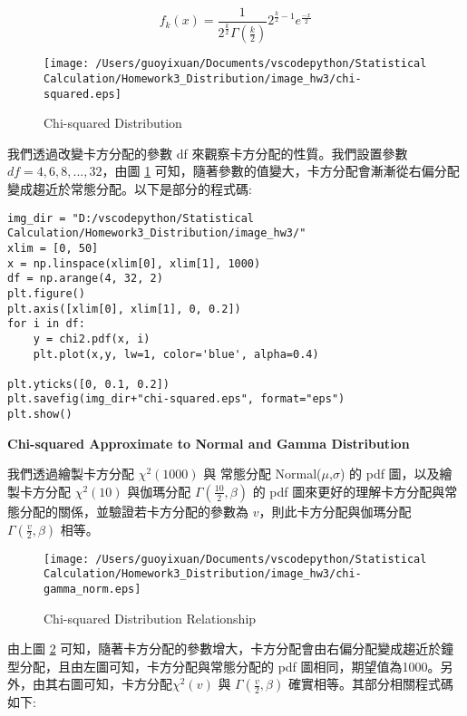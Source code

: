 \begin{equation}
f_k(x)=\frac{1}{2^{\frac{k}{2}}\Gamma{(\frac{k}{2})}}2^{\frac{k}{2}-1}e^{\frac{-x}{2}}
\end{equation}

\begin{figure}[H]
    \centering
        \texttt{[image: /Users/guoyixuan/Documents/vscodepython/Statistical Calculation/Homework3\_Distribution/image\_hw3/chi-squared.eps]}
    \caption{Chi-squared Distribution}
    \label{fig:Chi-squared Distribution}
\end{figure}

我們透過改變卡方分配的參數 df 來觀察卡方分配的性質。我們設置參數 $df=4, 6, 8,...,32$，由圖 \ref{fig:Chi-squared Distribution} 可知，隨著參數的值變大，卡方分配會漸漸從右偏分配變成趨近於常態分配。以下是部分的程式碼:

\bigskip
\begin{lstlisting}
img_dir = "D:/vscodepython/Statistical Calculation/Homework3_Distribution/image_hw3/"
xlim = [0, 50]
x = np.linspace(xlim[0], xlim[1], 1000) 
df = np.arange(4, 32, 2)
plt.figure()
plt.axis([xlim[0], xlim[1], 0, 0.2])
for i in df:
    y = chi2.pdf(x, i)
    plt.plot(x,y, lw=1, color='blue', alpha=0.4)
    
plt.yticks([0, 0.1, 0.2])
plt.savefig(img_dir+"chi-squared.eps", format="eps")
plt.show()
\end{lstlisting}


\textbf{Chi-squared Approximate to Normal and Gamma Distribution}

我們透過繪製卡方分配 $\chi^2(1000)$ 與 常態分配 Normal($\mu$,$\sigma$) 的 pdf 圖，以及繪製卡方分配 $\chi^2(10)$ 與伽瑪分配 $\Gamma(\frac{10}{2}, \beta)$ 的 pdf 圖來更好的理解卡方分配與常態分配的關係，並驗證若卡方分配的參數為 $v$，則此卡方分配與伽瑪分配 $\Gamma(\frac{v}{2}, \beta)$ 相等。

\begin{figure}[H]
    \centering
        \texttt{[image: /Users/guoyixuan/Documents/vscodepython/Statistical Calculation/Homework3\_Distribution/image\_hw3/chi-gamma\_norm.eps]}
    \caption{Chi-squared Distribution Relationship}
    \label{Chi-squared Relationship}
\end{figure}

由上圖 \ref{Chi-squared Relationship} 可知，隨著卡方分配的參數增大，卡方分配會由右偏分配變成趨近於鐘型分配，且由左圖可知，卡方分配與常態分配的 pdf 圖相同，期望值為1000。另外，由其右圖可知，卡方分配$\chi^2(v)$ 與 $\Gamma(\frac{v}{2}, \beta)$ 確實相等。其部分相關程式碼如下:

